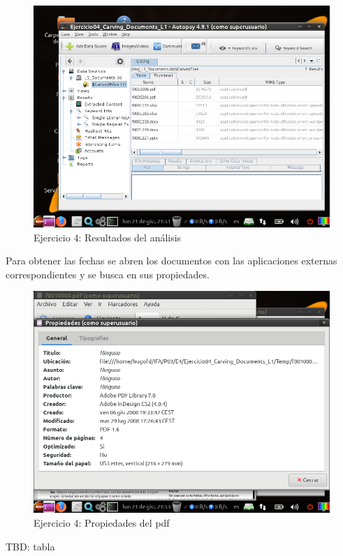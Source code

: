 \documentclass[11pt]{article}
\begin{document}
\begin{figure}[H]
  \caption{Ejercicio 4: Resultados del análisis}
  \centering
  \includegraphics[scale=0.7]{e4-5.png}
\end{figure}

Para obtener las fechas se abren los documentos con las aplicaciones externas correspondientes y se busca en sus propiedades.

\begin{figure}[H]
  \caption{Ejercicio 4: Propiedades del pdf}
  \centering
  \includegraphics[scale=0.7]{e4-6.png}
\end{figure}

TBD: tabla



\begin{thebibliography}{8}
\end{thebibliography}
\end{document}
